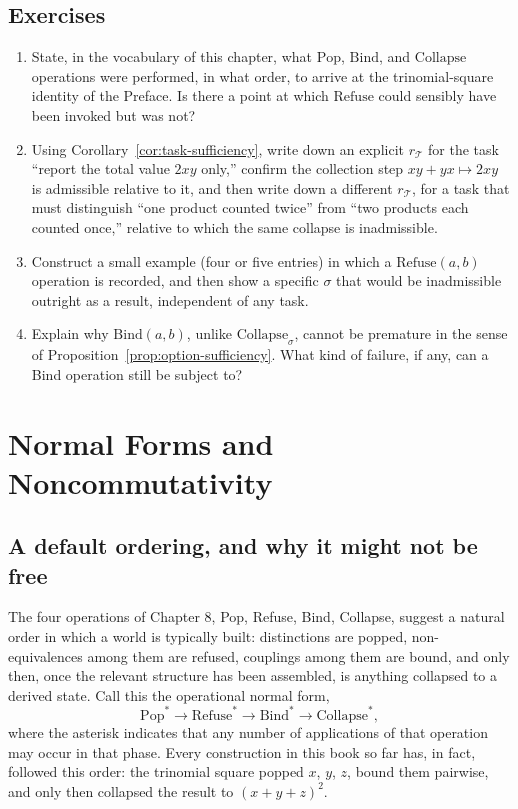 \documentclass[11pt]{book}
\begin{document}
\section*{Exercises}
\begin{enumerate}
\item State, in the vocabulary of this chapter, what $\mathrm{Pop}$, $\mathrm{Bind}$, and $\mathrm{Collapse}$ operations were performed, in what order, to arrive at the trinomial-square identity of the Preface. Is there a point at which $\mathrm{Refuse}$ could sensibly have been invoked but was not?
\item Using Corollary~\ref{cor:task-sufficiency}, write down an explicit $r_{\mathcal T}$ for the task ``report the total value $2xy$ only,'' confirm the collection step $xy+yx\mapsto 2xy$ is admissible relative to it, and then write down a different $r_{\mathcal T}$, for a task that must distinguish ``one product counted twice'' from ``two products each counted once,'' relative to which the same collapse is inadmissible.
\item Construct a small example (four or five entries) in which a $\mathrm{Refuse}(a,b)$ operation is recorded, and then show a specific $\sigma$ that would be inadmissible outright as a result, independent of any task.
\item Explain why $\mathrm{Bind}(a,b)$, unlike $\mathrm{Collapse}_\sigma$, cannot be premature in the sense of Proposition~\ref{prop:option-sufficiency}. What kind of failure, if any, can a Bind operation still be subject to?
\end{enumerate}

\chapter{Normal Forms and Noncommutativity}

\section{A default ordering, and why it might not be free}

The four operations of Chapter 8, Pop, Refuse, Bind, Collapse, suggest a natural order in which a world is typically built: distinctions are popped, non-equivalences among them are refused, couplings among them are bound, and only then, once the relevant structure has been assembled, is anything collapsed to a derived state. Call this the operational normal form,
\[
\mathrm{Pop}^{*} \to \mathrm{Refuse}^{*} \to \mathrm{Bind}^{*} \to \mathrm{Collapse}^{*},
\]
where the asterisk indicates that any number of applications of that operation may occur in that phase. Every construction in this book so far has, in fact, followed this order: the trinomial square popped $x$, $y$, $z$, bound them pairwise, and only then collapsed the result to $(x+y+z)^2$.
\end{document}
